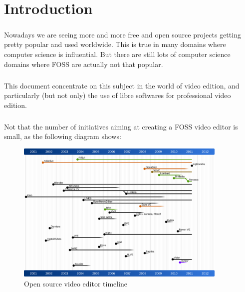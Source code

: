 

\setcounter{page}{1}
\chapter*{Introduction}
    \paragraph{}
        Nowadays we are seeing more and more free and open source projects
        getting pretty popular and used worldwide. This is true in many
        domains where computer science is influential. But there are
        still lots of computer science domains where FOSS are actually not that
        popular.

    \paragraph{}
        This document concentrate on this subject in the world of video
        edition, and particularly (but not only) the use of libre softwares
        for professional video edition.

    \paragraph{}
        Not that the number of initiatives aiming at creating a FOSS video
        editor is small, as the following diagram shows:

        \begin{figure}[!htbp]
            \begin{center}
                \includegraphics[width=0.9\textwidth]{images/open-source-video-editor-timeline}
            \end{center}
            \caption{Open source video editor timeline}
            \label{Yes}
        \end{figure}

